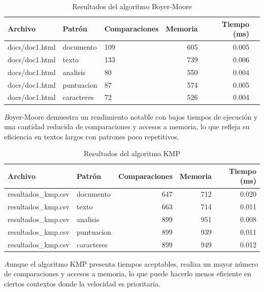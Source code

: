 \documentclass[9pt,letterpaper,onecolumn]{rho-class/rho}
\begin{document}
\begin{table}[H]
\centering
\caption{Resultados del algoritmo Boyer-Moore}
\label{tab:bm}
\begin{tabular}{|l|l|l|r|r|r|}
\hline
\textbf{Archivo} & \textbf{Patrón} & \textbf{Comparaciones} & \textbf{Memoria} & \textbf{Tiempo (ms)} \\
\hline
docs/doc1.html & documento & 109 & 605 & 0.005 \\
docs/doc1.html & texto & 133 & 739 & 0.006 \\
docs/doc1.html & analisis & 80 & 550 & 0.004 \\
docs/doc1.html & puntuacion & 87 & 574 & 0.005 \\
docs/doc1.html & caracteres & 72 & 526 & 0.004 \\
\hline
\end{tabular}
\end{table}

\vspace{0.5em}
\noindent\textit Boyer-Moore demuestra un rendimiento notable con bajos tiempos de ejecución y una cantidad reducida de comparaciones y accesos a memoria, lo que refleja su eficiencia en textos largos con patrones poco repetitivos.

\vspace{1em}

\begin{table}[H]
\centering
\caption{Resultados del algoritmo KMP}
\label{tab:kmp}
\begin{tabular}{|l|l|r|r|r|}
\hline
\textbf{Archivo} & \textbf{Patrón} & \textbf{Comparaciones} & \textbf{Memoria} & \textbf{Tiempo (ms)} \\
\hline
resultados\_kmp.csv & documento & 647 & 712 & 0.020 \\
resultados\_kmp.csv & texto & 663 & 714 & 0.011 \\
resultados\_kmp.csv & analisis & 899 & 951 & 0.008 \\
resultados\_kmp.csv & puntuacion & 899 & 939 & 0.011 \\
resultados\_kmp.csv & caracteres & 899 & 949 & 0.012 \\
\hline
\end{tabular}
\end{table}

\vspace{0.5em}
\noindent\textit Aunque el algoritmo KMP presenta tiempos aceptables, realiza un mayor número de comparaciones y accesos a memoria, lo que puede hacerlo menos eficiente en ciertos contextos donde la velocidad es prioritaria.
\end{document}
